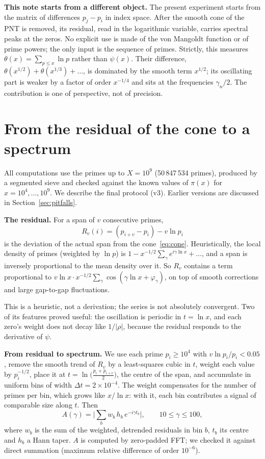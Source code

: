 \documentclass[11pt,a4paper]{article}
\newcommand{\para}[1]{\textsf{\bfseries #1}\hspace{0.45em}}
\begin{document}
\para{This note starts from a different object.} The present experiment starts from the matrix of differences $p_j-p_i$ in index space. After the smooth cone of the PNT is removed, its residual, read in the logarithmic variable, carries spectral peaks at the zeros. No explicit use is made of the von Mangoldt function or of prime powers; the only input is the sequence of primes. Strictly, this measures $\theta(x)=\sum_{p\le x}\ln p$ rather than $\psi(x)$. Their difference, $\theta(x^{1/2})+\theta(x^{1/3})+\dots$, is dominated by the smooth term $x^{1/2}$; its oscillating part is weaker by a factor of order $x^{-1/4}$ and sits at the frequencies $\gamma_n/2$. The contribution is one of perspective, not of precision.

\section{From the residual of the cone to a spectrum}\label{sec:method}

All computations use the primes up to $X=10^9$ (50\,847\,534 primes), produced by a segmented sieve and checked against the known values of $\pi(x)$ for $x=10^4,\dots,10^9$. We describe the final protocol (v3). Earlier versions are discussed in Section~\ref{sec:pitfalls}.

\para{The residual.} For a span of $v$ consecutive primes,
\begin{equation}\label{eq:residual}
R_v(i)=\left(p_{i+v}-p_i\right)-v\ln p_i
\end{equation}
is the deviation of the actual span from the cone~\eqref{eq:cone}. Heuristically, the local density of primes (weighted by $\ln p$) is $1-x^{-1/2}\sum_\gamma e^{i\gamma\ln x}+\dots$, and a span is inversely proportional to the mean density over it. So $R_v$ contains a term proportional to $v\ln x\cdot x^{-1/2}\sum_\gamma\cos(\gamma\ln x+\varphi_\gamma)$, on top of smooth corrections and large gap-to-gap fluctuations.

This is a heuristic, not a derivation; the series is not absolutely convergent. Two of its features proved useful: the oscillation is periodic in $t=\ln x$, and each zero's weight does not decay like $1/|\rho|$, because the residual responds to the derivative of $\psi$.

\para{From residual to spectrum.} We use each prime $p_i\ge10^4$ with $v\ln p_i/p_i<0.05$, remove the smooth trend of $R_v$ by a least-squares cubic in $t$, weight each value by $p_i^{-1/2}$, place it at $t=\ln\!\big(\tfrac{p_i+p_{i+v}}{2}\big)$, the centre of the span, and accumulate in uniform bins of width $\Delta t=2\times10^{-4}$. The weight compensates for the number of primes per bin, which grows like $x/\ln x$: with it, each bin contributes a signal of comparable size along $t$. Then
\begin{equation}\label{eq:spectrum}
A(\gamma)=\Big|\sum_b w_b\,h_b\,e^{-i\gamma t_b}\Big|,\qquad 10\le\gamma\le100,
\end{equation}
where $w_b$ is the sum of the weighted, detrended residuals in bin $b$, $t_b$ its centre and $h_b$ a Hann taper. $A$ is computed by zero-padded FFT; we checked it against direct summation (maximum relative difference of order $10^{-6}$).
\end{document}
